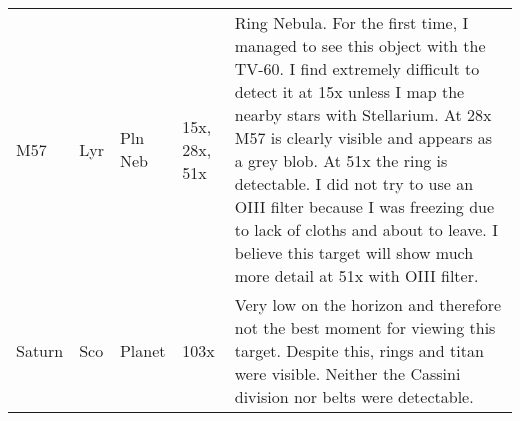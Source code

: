 \begin{longtable}{ p{0.7in}  p{0.3in}  p{0.6in}  p{0.9in}  p{5.8in} }
M57 & Lyr & Pln Neb & 15x, 28x, 51x & Ring Nebula. For the first time, I managed to see this object with the TV-60. I find extremely difficult to detect it at 15x unless I map the nearby stars with Stellarium. At 28x M57 is clearly visible and appears as a grey blob. At 51x the ring is detectable. I did not try to use an OIII filter because I was freezing due to lack of cloths and about to leave. I believe this target will show much more detail at 51x with OIII filter. \\ 
Saturn & Sco & Planet & 103x & Very low on the horizon and therefore not the best moment for viewing this target. Despite this, rings and titan were visible. Neither the Cassini division nor belts were detectable. \\ 
\hline 
\end{longtable} 
